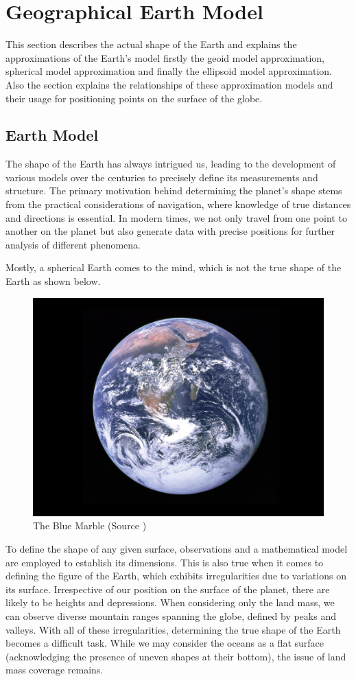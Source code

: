 

\section{Geographical Earth Model}
This section describes the actual shape of the Earth and explains the approximations of the Earth's model firstly the geoid model approximation, spherical model approximation and finally the ellipsoid model approximation.
Also the section explains the relationships of these approximation models and their usage for positioning points on the surface of the globe.


\subsection{Earth Model}

The shape of the Earth has always intrigued us, leading to the development of various models over the centuries to precisely define its measurements and structure.
The primary motivation behind determining the planet's shape stems from the practical considerations of navigation, where knowledge of true distances and directions is essential.
In modern times, we not only travel from one point to another on the planet but also generate data with precise positions for further analysis of different phenomena.


Mostly, a spherical Earth comes to the mind, which is not the true shape of the Earth as shown below.

\begin{figure}[h]
    \centering
    \includegraphics[width=0.5\linewidth]{figures/chapter-2/earth.jpg}
    \caption{The Blue Marble (Source \cite{EARTH_IMAGE}) }
    \label{fig:earth}
\end{figure}


To define the shape of any given surface, observations and a mathematical model are employed to establish its dimensions.
This is also true when it comes to defining the figure of the Earth, which exhibits irregularities due to variations on its surface.
Irrespective of our position on the surface of the planet, there are likely to be heights and depressions. When considering only the land mass, we can observe diverse mountain
ranges spanning the globe, defined by peaks and valleys.
With all of these irregularities, determining the true shape of the Earth becomes a difficult task.
While we may consider the oceans as a flat surface (acknowledging the presence of uneven shapes at their bottom), the issue of land mass coverage remains.

